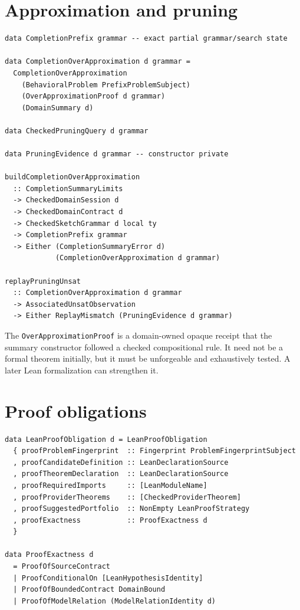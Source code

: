 \documentclass[11pt,oneside]{report}
\newcommand{\code}[1]{\texttt{#1}}
\begin{document}
\section{Approximation and pruning}

\begin{lstlisting}[language=HaskellX,caption={Completion-summary interface.}]
data CompletionPrefix grammar -- exact partial grammar/search state

data CompletionOverApproximation d grammar =
  CompletionOverApproximation
    (BehavioralProblem PrefixProblemSubject)
    (OverApproximationProof d grammar)
    (DomainSummary d)

data CheckedPruningQuery d grammar

data PruningEvidence d grammar -- constructor private

buildCompletionOverApproximation
  :: CompletionSummaryLimits
  -> CheckedDomainSession d
  -> CheckedDomainContract d
  -> CheckedSketchGrammar d local ty
  -> CompletionPrefix grammar
  -> Either (CompletionSummaryError d)
            (CompletionOverApproximation d grammar)

replayPruningUnsat
  :: CompletionOverApproximation d grammar
  -> AssociatedUnsatObservation
  -> Either ReplayMismatch (PruningEvidence d grammar)
\end{lstlisting}

The \code{OverApproximationProof} is a domain-owned opaque receipt that the summary constructor followed a checked compositional rule. It need not be a formal theorem initially, but it must be unforgeable and exhaustively tested. A later Lean formalization can strengthen it.

\section{Proof obligations}

\begin{lstlisting}[language=HaskellX,caption={Backend-neutral Lean proof obligation.}]
data LeanProofObligation d = LeanProofObligation
  { proofProblemFingerprint  :: Fingerprint ProblemFingerprintSubject
  , proofCandidateDefinition :: LeanDeclarationSource
  , proofTheoremDeclaration  :: LeanDeclarationSource
  , proofRequiredImports     :: [LeanModuleName]
  , proofProviderTheorems    :: [CheckedProviderTheorem]
  , proofSuggestedPortfolio  :: NonEmpty LeanProofStrategy
  , proofExactness           :: ProofExactness d
  }

data ProofExactness d
  = ProofOfSourceContract
  | ProofConditionalOn [LeanHypothesisIdentity]
  | ProofOfBoundedContract DomainBound
  | ProofOfModelRelation (ModelRelationIdentity d)
\end{lstlisting}
\end{document}
